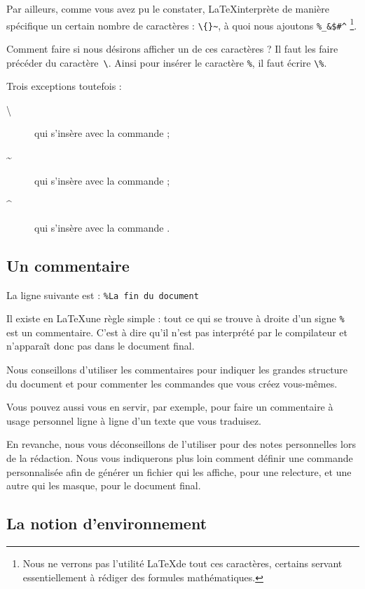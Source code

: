 Par ailleurs, comme vous avez pu le constater, \LaTeX interprète de manière spécifique un certain nombre de caractères : \verb|\{}~|, à quoi nous ajoutons \verb|%_&$#^| \footnote{Nous ne verrons pas l'utilité \LaTeX  de tout ces caractères, certains servant essentiellement à rédiger des formules mathématiques.}.

Comment faire si nous désirons afficher un de ces caractères ? Il faut les faire précéder du caractère~\verb|\|. Ainsi pour insérer le caractère \verb|%|, il faut écrire \verb|\%|. 

Trois exceptions toutefois :
\begin{description}
\item[\textbackslash] qui s'insère avec la commande  ;
\item[\textasciitilde] qui s'insère avec la commande  ; 
\item[\textasciicircum] qui s'insère avec la commande . 
\end{description} 
\subsection{Un commentaire}

La ligne suivante est : \verb|%La fin du document|

Il existe en \LaTeX une règle simple : tout ce qui se trouve à droite d'un signe \verb|%| est un commentaire.
C'est à dire qu'il n'est pas interprété par le compilateur et n'apparaît donc pas dans le document final. 

Nous conseillons d'utiliser les commentaires pour indiquer les grandes structure du document et pour commenter les commandes que vous créez vous-mêmes. 

Vous pouvez aussi vous en servir, par exemple, pour faire un commentaire à usage personnel ligne à ligne d'un texte que vous traduisez.

En revanche, nous vous déconseillons de l'utiliser pour des notes personnelles lors de la rédaction. Nous vous indiquerons plus loin  comment définir une commande  personnalisée afin de générer un fichier qui les affiche, pour une relecture, et une autre qui les masque, pour le document final.



\subsection{La notion d'environnement }

